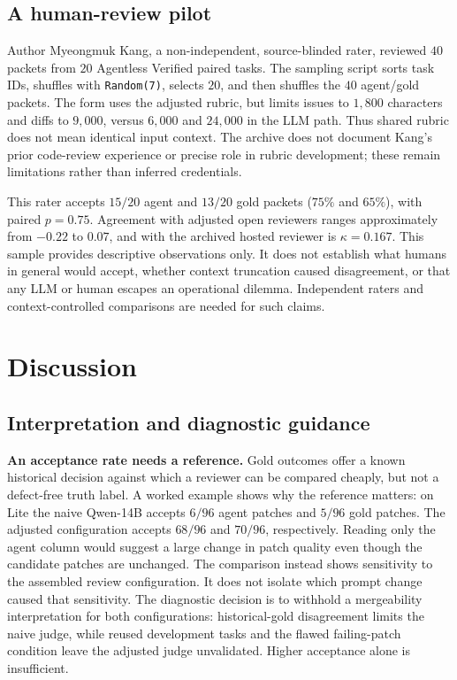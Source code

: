 \documentclass[10pt,conference]{IEEEtran}
\begin{document}
\subsection{A human-review pilot}
Author Myeongmuk Kang, a non-independent, source-blinded rater, reviewed $40$ packets from
$20$ Agentless Verified paired tasks. The sampling script sorts task IDs, shuffles with \texttt{Random(7)}, selects
$20$, and then shuffles the $40$ agent/gold packets. The form uses the adjusted rubric,
but limits issues to $1{,}800$ characters and diffs to $9{,}000$, versus $6{,}000$ and
$24{,}000$ in the LLM path. Thus shared rubric does not mean identical input context.
The archive does not document Kang's prior code-review experience or precise role in rubric
development; these remain limitations rather than inferred credentials.

This rater accepts $15/20$ agent and $13/20$ gold packets ($75\%$ and $65\%$), with
paired $p=0.75$. Agreement with adjusted open reviewers ranges approximately from
$-0.22$ to $0.07$, and with the archived hosted reviewer is $\kappa=0.167$. This sample
provides descriptive observations only. It does not establish what humans in general would
accept, whether context truncation caused disagreement, or that any LLM or human escapes
an operational dilemma. Independent raters and context-controlled comparisons are needed
for such claims.

\section{Discussion}
\label{sec:discussion}
\subsection{Interpretation and diagnostic guidance}
\textbf{An acceptance rate needs a reference.} Gold outcomes offer a known historical
decision against which a reviewer can be compared cheaply, but not a defect-free truth
label. A worked example shows why the reference matters: on Lite the naive Qwen-14B
accepts $6/96$ agent patches and $5/96$ gold patches. The adjusted configuration accepts
$68/96$ and $70/96$, respectively. Reading only the agent column would suggest a large
change in patch quality even though the candidate patches are unchanged. The comparison
instead shows sensitivity to the assembled review configuration. It does not isolate
which prompt change caused that sensitivity. The diagnostic decision is to withhold
a mergeability interpretation for both configurations: historical-gold disagreement
limits the naive judge, while reused development tasks and the flawed failing-patch
condition leave the adjusted judge unvalidated. Higher acceptance alone is insufficient.
\end{document}
